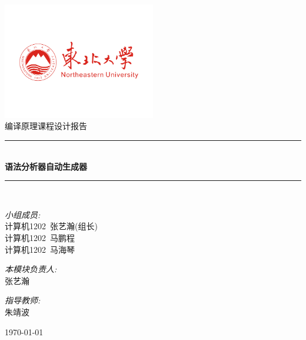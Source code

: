 \documentclass[11pt]{article}
\newcommand{\HRule}{\rule{\linewidth}{0.5mm}}
\begin{document}
\begin{titlepage}
\begin{center}

\includegraphics[width=0.5\textwidth]{./neu.png}~\\[0.1cm]


\textsc{\Large 编译原理课程设计报告\uppercase\expandafter{}}\\[0.5cm]

\HRule \\[0.2cm]
{ \huge \bfseries 语法分析器自动生成器 \\[0.4cm] }

\HRule \\[1cm]

\noindent
\begin{minipage}{0.4\textwidth}
\begin{flushleft} \large
\emph{小组成员:}\\
计算机1202\ 张艺瀚(组长) \\ %
计算机1202\ 马鹏程 \\
计算机1202\ 马海琴
\end{flushleft}
\end{minipage}%
\begin{minipage}{0.2\textwidth}
\begin{flushright} \large
\emph{本模块负责人:}\\
张艺瀚 \\ %
\end{flushright}
\end{minipage}%
\begin{minipage}{0.2\textwidth}
\begin{flushright} \large
\emph{指导教师:} \\
朱靖波 %
\end{flushright}
\end{minipage}

\vfill

{\large \today}

\end{center}
\end{titlepage}
\end{document}
